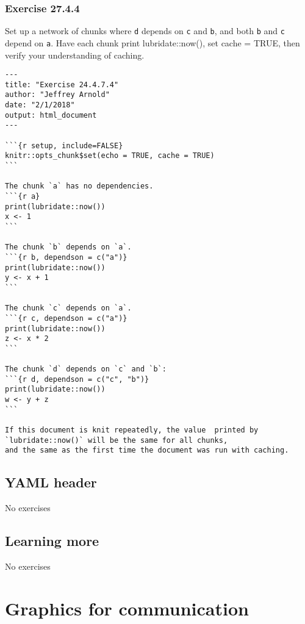 \documentclass[]{book}
\theoremstyle{plain}
\theoremstyle{remark}
\theoremstyle{definition}
\theoremstyle{definition}
\theoremstyle{definition}
\theoremstyle{remark}
\begin{document}
\hypertarget{exercise-27.4.4}{%
\subsection*{\texorpdfstring{Exercise
{27.4.4}}{Exercise 27.4.4}}\label{exercise-27.4.4}}

Set up a network of chunks where \texttt{d} depends on \texttt{c} and
\texttt{b}, and both \texttt{b} and \texttt{c} depend on \texttt{a}.
Have each chunk print lubridate::now(), set cache = TRUE, then verify
your understanding of caching.

\begin{verbatim}
---
title: "Exercise 24.4.7.4"
author: "Jeffrey Arnold"
date: "2/1/2018"
output: html_document
---

```{r setup, include=FALSE}
knitr::opts_chunk$set(echo = TRUE, cache = TRUE)
```

The chunk `a` has no dependencies.
```{r a}
print(lubridate::now())
x <- 1
```

The chunk `b` depends on `a`.
```{r b, dependson = c("a")}
print(lubridate::now())
y <- x + 1
```

The chunk `c` depends on `a`.
```{r c, dependson = c("a")}
print(lubridate::now())
z <- x * 2
```

The chunk `d` depends on `c` and `b`:
```{r d, dependson = c("c", "b")}
print(lubridate::now())
w <- y + z
```

If this document is knit repeatedly, the value  printed by `lubridate::now()` will be the same for all chunks,
and the same as the first time the document was run with caching.
\end{verbatim}

\hypertarget{yaml-header}{%
\section{YAML header}\label{yaml-header}}

No exercises

\hypertarget{learning-more-1}{%
\section{Learning more}\label{learning-more-1}}

No exercises

\hypertarget{graphics-for-communication}{%
\chapter{Graphics for communication}\label{graphics-for-communication}}
\end{document}
